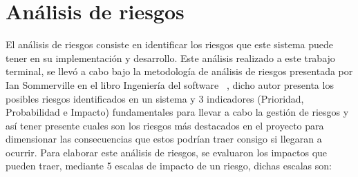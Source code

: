 \section{Análisis de riesgos} 

El análisis de riesgos consiste en identificar los riesgos que este sistema puede tener en su implementación y desarrollo. Este análisis realizado a este trabajo terminal, se llevó a cabo bajo la metodología de análisis de riesgos presentada por Ian Sommerville en el libro Ingeniería del software ~\cite{sommerville}, dicho autor presenta los posibles riesgos identificados en un sistema y 3 indicadores (Prioridad, Probabilidad e Impacto) fundamentales para llevar a cabo la gestión de riesgos y así tener presente cuales son los riesgos más destacados en el proyecto para dimensionar las consecuencias que estos podrían traer consigo si llegaran a ocurrir. Para elaborar este análisis de riesgos, se evaluaron los impactos que pueden traer, mediante 5 escalas de impacto de un riesgo, dichas escalas son: 

